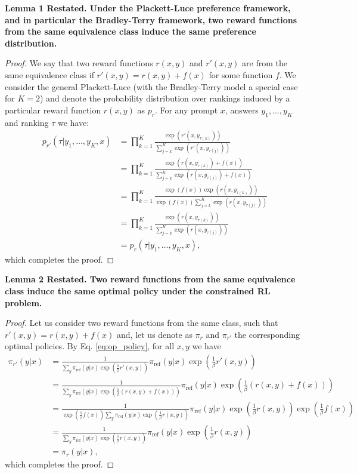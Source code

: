 \documentclass{article}
\begin{document}
\begin{em}
\bf Lemma 1 Restated. Under the Plackett-Luce preference framework, and in particular the Bradley-Terry framework, two reward functions from the same equivalence class induce the same preference distribution.
\end{em}
\begin{proof}
We say that two reward functions $r(x, y)$ and $r'(x, y)$ are from the same equivalence class if $r'(x, y) = r(x, y) + f(x)$ for some function $f$. We consider the general Plackett-Luce (with the Bradley-Terry model a special case for $K=2$) and denote the probability distribution over rankings induced by a particular reward function $r(x, y)$ as $p_r$. For any prompt $x$, answers $y_1,\ldots, y_K$ and ranking $\tau$ we have:
\begin{align*}
    p_{r'}(\tau| y_1,\ldots, y_K, x) &=
     \prod_{k=1}^{K}\frac{\exp(r'(x, y_{\tau(k)}))}{\sum_{j=k}^{K}\exp(r'(x, y_{\tau(j)}))} \\
     &= \prod_{k=1}^{K}\frac{\exp(r(x, y_{\tau(k)}) + f(x))}{\sum_{j=k}^{K}\exp(r(x, y_{\tau(j)})+f(x))} \\
     &= \prod_{k=1}^{K}\frac{\exp(f(x))\exp(r(x, y_{\tau(k)}))}{\exp(f(x))\sum_{j=k}^{K}\exp(r(x, y_{\tau(j)}))} \\
     &= \prod_{k=1}^{K}\frac{\exp(r(x, y_{\tau(k)}))}{\sum_{j=k}^{K}\exp(r(x, y_{\tau(j)}))} \\
     &= p_{r}(\tau| y_1,\ldots, y_K, x),
\end{align*}
which completes the proof.
\end{proof}

\begin{em}
\bf Lemma 2 Restated. Two reward functions from the same equivalence class induce the same optimal policy under the constrained RL problem.
\end{em}
\begin{proof}
Let us consider two reward functions from the same class, such that $r'(x, y)=r(x, y)+f(x)$ and, let us denote as $\pi_r$ and $\pi_{r'}$ the corresponding optimal policies. By Eq. \ref{eq:op_policy}, for all $x, y$ we have
\begin{align*}
    \pi_{r'}(y|x) &= \frac{1}{\sum_{y}\pi_\text{ref}(y|x)\exp\left(\frac{1}{\beta}r'(x, y)\right)}\pi_\text{ref}(y|x)\exp\left(\frac{1}{\beta}r'(x, y)\right) \\
    &= \frac{1}{\sum_{y}\pi_\text{ref}(y|x)\exp\left(\frac{1}{\beta}(r(x, y) + f(x))\right)}\pi_\text{ref}(y|x)\exp\left(\frac{1}{\beta}(r(x, y)+f(x))\right) \\
    &= \frac{1}{\exp\left(\frac{1}{\beta}f(x)\right)\sum_{y}\pi_\text{ref}(y|x)\exp\left(\frac{1}{\beta}r(x, y)\right)}\pi_\text{ref}(y|x)\exp\left(\frac{1}{\beta}r(x, y)\right)\exp\left(\frac{1}{\beta}f(x)\right) \\
    &= \frac{1}{\sum_{y}\pi_\text{ref}(y|x)\exp\left(\frac{1}{\beta}r(x, y)\right)}\pi_\text{ref}(y|x)\exp\left(\frac{1}{\beta}r(x, y)\right) \\
    &= \pi_r(y|x),
\end{align*}
which completes the proof.
\end{proof}
\end{document}
